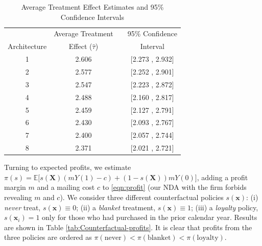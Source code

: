 \documentclass[11pt]{article}
\numberwithin{equation}{section}
\theoremstyle{definition}
\newcommand{\E}{\mathbb{E}}
\newcommand{\bx}{\bm{x}}
\newcommand{\bX}{\bm{X}}
\begin{document}
\begin{table}[ht!]
	\caption{Average Treatment Effect Estimates and 95\% Confidence Intervals}
	\label{tab:ATE-Estimates-and}
	\centering 
	\begin{tabular}{cccc}
		\hline
		\hline
		& Average Treatment & & 95\% Confidence   \\ 
		Architecture & Effect ($\hat{\tau}$) & & Interval   \\ 	  
		\hline
		1 & 2.606 & & [2.273 , 2.932]   \\
		2 & 2.577 & & [2.252 , 2.901]   \\    
		3 & 2.547 & & [2.223 , 2.872]   \\    
		4 & 2.488 & & [2.160 , 2.817]   \\    
		5 & 2.459 & & [2.127 , 2.791]   \\    
		6 & 2.430 & & [2.093 , 2.767]   \\    
		7 & 2.400 & & [2.057 , 2.744]   \\    
		8 & 2.371 & & [2.021 , 2.721]   \\     
		\hline 
	\end{tabular}
\end{table}




Turning to expected profits, we estimate $\pi(s) = \E \big[s(\bX)(mY(1) - c) + \left(1 - s(\bX)\right) m Y(0) \big]$, adding a profit margin $m$ and a mailing cost $c$ to \eqref{eqn:profit} (our NDA with the firm forbids revealing $m$ and $c$). We consider three different counterfactual policies $s(\bx)$: (i) \emph{never} treat, $s(\bx) \equiv 0$; (ii) a \emph{blanket} treatment, $s(\bx) \equiv 1$; (iii) a \emph{loyalty} policy, $s(\bx_i) = 1$ only for those who had purchased in the prior calendar year. 
Results are shown in Table \ref{tab:Counterfactual-profits}. It is clear that profits from the three policies are ordered as $\pi(\text{never}) < \pi(\text{blanket}) < \pi(\text{loyalty})$. 
\end{document}
